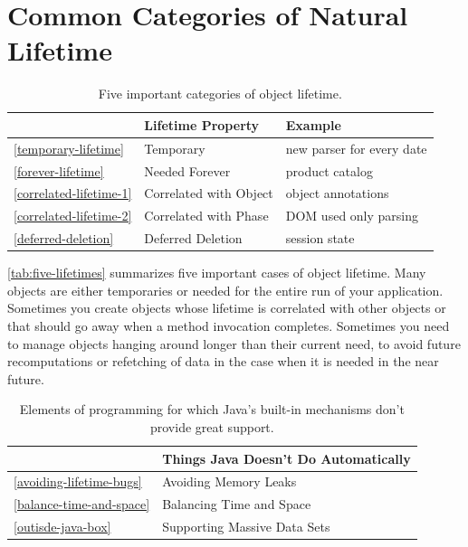 \section{Common Categories of Natural Lifetime}

\begin{table}
\centering
	\begin{tabular}{lp{}p{}}
	\toprule  & Lifetime Property & Example \\ \midrule
	\autoref{temporary-lifetime}  & {Temporary} & new
	parser for every date
	\\
	\autoref{forever-lifetime} & {Needed Forever} & product catalog
	\\
	\autoref{correlated-lifetime-1} & {Correlated with Object}
	& object annotations
	\\
	\autoref{correlated-lifetime-2} & {Correlated with Phase} &
	DOM used only parsing
	\\
	\autoref{deferred-deletion} & {Deferred Deletion} &
	session state \\
	\bottomrule
	\end{tabular}
	\caption{Five important categories of object lifetime.}
	\label{tab:five-lifetimes}
\end{table}

\autoref{tab:five-lifetimes} summarizes five important cases of object lifetime.
Many objects are either temporaries or needed for
the entire run of your application. Sometimes you create objects whose lifetime
is correlated with other objects or that should go away when a method invocation
completes. Sometimes you need to manage objects hanging around longer than their
current need, to avoid future recomputations or refetching of data in the case
when it is needed in the near future. 


\begin{table}
\centering
	\begin{tabular}{ll} \toprule
    	& Things Java Doesn't Do Automatically \\ \midrule
    	\autoref{avoiding-lifetime-bugs} & {Avoiding Memory Leaks} \\
    	\autoref{balance-time-and-space} & {Balancing Time and Space} \\
    	\autoref{outisde-java-box} & {Supporting Massive Data Sets}  	\\
        \bottomrule
    \end{tabular}
	\caption{Elements of programming for which Java's built-in mechanisms don't
	provide great support.}
	\label{tab:things-java-does-not-do}
\end{table}


